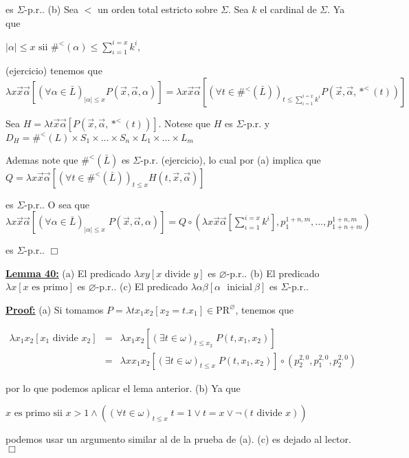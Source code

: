   es \(\Sigma \)-p.r..
  (b) Sea \(< \) un orden total estricto sobre \(\Sigma .\) Sea \(k\) el cardinal de \( \Sigma \). Ya que

  \(\displaystyle \left\vert \alpha \right\vert \leq x\text{ sii }\#^{< }(\alpha )\leq \sum_{\iota =1}^{i=x}k^{i}, \)

  (ejercicio) tenemos que
  \(\displaystyle \lambda x\vec{x}\vec{\alpha}\left[ (\forall \alpha \in \bar{L})_{\left\vert \alpha \right\vert \leq x}P(\vec{x},\vec{\alpha},\alpha )\right] =\lambda x \vec{x}\vec{\alpha}\left[ (\forall t\in \#^{< }(\bar{L}))_{t\leq \sum_{\iota =1}^{i=x}k^{i}}P(\vec{x},\vec{\alpha},\ast ^{< }(t))\right] \)

  Sea \(H=\lambda t\vec{x}\vec{\alpha}\left[ P(\vec{x},\vec{\alpha},\ast ^{< }(t))\right] .\) Notese que \(H\) es \(\Sigma \)-p.r. y
  \(\displaystyle D_{H}=\#^{< }(L)\times S_{1}\times ...\times S_{n}\times L_{1}\times ...\times L_{m} \)

  Ademas note que \(\#^{< }(\bar{L})\) es \(\Sigma \)-p.r. (ejercicio), lo cual por (a) implica que
  \(\displaystyle Q=\lambda x\vec{x}\vec{\alpha}\left[ (\forall t\in \#^{< }(\bar{L}))_{t\leq x}H(t,\vec{x},\vec{\alpha})\right] \)

  es \(\Sigma \)-p.r.. O sea que
  \(\displaystyle \lambda x\vec{x}\vec{\alpha}\left[ (\forall \alpha \in \bar{L})_{\left\vert \alpha \right\vert \leq x}\;P(\vec{x},\vec{\alpha},\alpha )\right] =Q\circ \left( \lambda x\vec{x}\vec{\alpha}\left[ \sum\limits_{\iota =1}^{i=x}k^{i} \right] ,p_{1}^{1+n,m},...,p_{1+n+m}^{1+n,m}\right) \)

  es \(\Sigma \)-p.r.. \(\Box\)


  \textbf{\underline{Lemma 40:}}
  (a) El predicado \(\lambda xy\left[ x\text{ divide }y\right] \) es \( \varnothing \)-p.r..
  (b) El predicado \(\lambda x\left[ x\text{ es primo}\right] \) es \( \varnothing \)-p.r..
  (c) El predicado \(\lambda \alpha \beta \left[ \alpha \text{\ }\mathrm{ inicial}\ \beta \right] \) es \(\Sigma \)-p.r..

  \textbf{\underline{Proof:}} (a) Si tomamos \(P=\lambda tx_{1}x_{2}\left[ x_{2}=t.x_{1}\right] \in \mathrm{PR}^{\varnothing }\), tenemos que

  \(\displaystyle \begin{array}{rcl} \lambda x_{1}x_{2}\left[ x_{1}\text{ divide }x_{2}\right] & =& \lambda x_{1}x_{2}\left[ (\exists t\in \omega )_{t\leq x_{2}}\;P(t,x_{1},x_{2}) \right] \\ & =& \lambda xx_{1}x_{2}\left[ (\exists t\in \omega )_{t\leq x}\;P(t,x_{1},x_{2})\right] \circ \left( p_{2}^{2,0},p_{1}^{2,0},p_{2}^{2,0}\right) \end{array} \)

  por lo que podemos aplicar el lema anterior.
  (b) Ya que

  \(\displaystyle x\text{ es primo sii }x >1\wedge \left( (\forall t\in \omega )_{t\leq x}\;t=1\vee t=x\vee \lnot (t\text{ divide }x)\right) \)

  podemos usar un argumento similar al de la prueba de (a).
  (c) es dejado al lector. \(\Box\)

